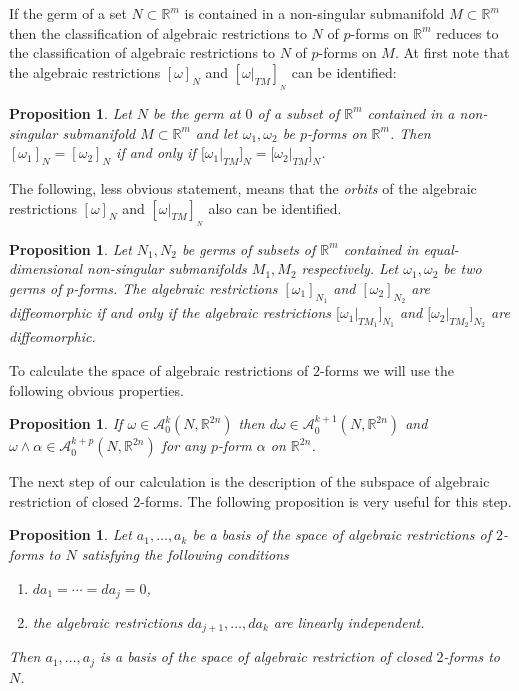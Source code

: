 \documentclass{amsart}
\newtheorem{prop}[thm]{Proposition}
\theoremstyle{definition}
\numberwithin{equation}{section}
\begin{document}
If the germ of a set $N\subset \mathbb R^m$ is contained in a
non-singular submanifold $M\subset \mathbb R^m$ then the
classification of algebraic restrictions to $N$ of $p$-forms on
$\mathbb R^m$ reduces to the classification of algebraic
restrictions to $N$ of $p$-forms on $M$. At first note that the
algebraic restrictions $[\omega ]_N$ and $[\omega \vert
_{TM}]_{_N}$ can be identified:

\begin{prop}
\label{reduction} Let $N$ be the germ at $0$ of a subset of
$\mathbb R^m$ contained  in a non-singular submanifold $M\subset
\mathbb R^m$ and let $\omega _1, \omega _2$ be $p$-forms on
$\mathbb R^m$. Then $[\omega _1]_N = [\omega _2]_N$ if and only if
$\bigl[\omega _1\vert _{TM}\bigr]_N = \bigl[\omega _2 \vert
_{TM}\bigr]_N$.
\end{prop}

The following, less obvious statement, means that the {\it orbits}
 of the algebraic restrictions $[\omega ]_N$ and $[\omega \vert
_{TM}]_{_N}$ also can be identified.

\begin{prop}
\label{main-reduction} Let $N_1,N_2$ be germs of subsets of
$\mathbb R^m$ contained in equal-dimensional non-singular
submanifolds $M_1, M_2$ respectively. Let $\omega _1, \omega _2$
be two germs of $p$-forms. The algebraic restrictions $[\omega
_1]_{N_1}$ and $[\omega _2]_{N_2}$ are diffeomorphic if and only
if the algebraic restrictions $\bigl[\omega _1\vert
_{TM_1}\bigr]_{N_1}$ and $\bigl[\omega _2\vert
_{TM_2}\bigr]_{N_2}$ are diffeomorphic.
\end{prop}

To calculate the space of algebraic restrictions of $2$-forms we
will use the following obvious properties.

\begin{prop}\label{d-wedge}
If $\omega\in \mathcal A_0^k(N,\mathbb R^{2n})$ then $d\omega
\in \mathcal A_0^{k+1}(N,\mathbb R^{2n})$ and $\omega\wedge
\alpha \in \mathcal A_0^{k+p}(N,\mathbb R^{2n})$ for any
$p$-form $\alpha$ on $\mathbb R^{2n}$.
\end{prop}

The next step of our calculation is the description of the
subspace of algebraic restriction of closed $2$-forms. The
following proposition is very useful for this step.
\begin{prop}
\label{th-all-closed} Let $a_1,\dots , a_k$ be a basis of the
space of algebraic restrictions of $2$-forms  to $N$ satisfying
the following conditions
\begin{enumerate}
\item $da_1 = \cdots = da_j = 0$, \item the algebraic restrictions
$da_{j+1}, \dots , da_k$ are linearly independent.
\end{enumerate}
 Then $a_1, \dots , a_j$ is a basis of the space
of algebraic restriction of closed $2$-forms to $N$.
\end{prop}
\end{document}
